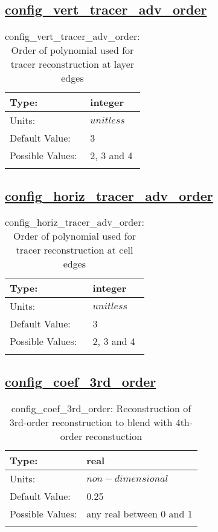\subsection[config\_vert\_tracer\_adv\_order]{\hyperref[sec:nm_tab_advection]{config\_vert\_tracer\_adv\_order}}
\label{subsec:nm_sec_config_vert_tracer_adv_order}
\begin{center}
\begin{longtable}{| p{2.0in} || p{4.0in} |}
    \hline
    Type: & integer \\
    \hline
    Units: & $unitless$ \\
    \hline
    Default Value: & 3 \\
    \hline
    Possible Values: & 2, 3 and 4 \\
    \hline
    \caption{config\_vert\_tracer\_adv\_order: Order of polynomial used for tracer reconstruction at layer edges}
\end{longtable}
\end{center}
\subsection[config\_horiz\_tracer\_adv\_order]{\hyperref[sec:nm_tab_advection]{config\_horiz\_tracer\_adv\_order}}
\label{subsec:nm_sec_config_horiz_tracer_adv_order}
\begin{center}
\begin{longtable}{| p{2.0in} || p{4.0in} |}
    \hline
    Type: & integer \\
    \hline
    Units: & $unitless$ \\
    \hline
    Default Value: & 3 \\
    \hline
    Possible Values: & 2, 3 and 4 \\
    \hline
    \caption{config\_horiz\_tracer\_adv\_order: Order of polynomial used for tracer reconstruction at cell edges}
\end{longtable}
\end{center}
\subsection[config\_coef\_3rd\_order]{\hyperref[sec:nm_tab_advection]{config\_coef\_3rd\_order}}
\label{subsec:nm_sec_config_coef_3rd_order}
\begin{center}
\begin{longtable}{| p{2.0in} || p{4.0in} |}
    \hline
    Type: & real \\
    \hline
    Units: & $non-dimensional$ \\
    \hline
    Default Value: & 0.25 \\
    \hline
    Possible Values: & any real between 0 and 1 \\
    \hline
    \caption{config\_coef\_3rd\_order: Reconstruction of 3rd-order reconstruction to blend with 4th-order reconstuction}
\end{longtable}
\end{center}
